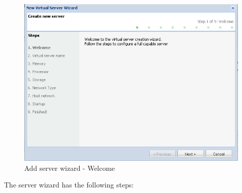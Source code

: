 \begin{figure}[H]
	\begin{center}
	\includegraphics[scale=0.5]{screenshots/server_createwiz.png}
	\caption{Add server wizard - Welcome}
	\label{fig:server_createwiz}
	\end{center}
\end{figure}
The server wizard has the following steps:
